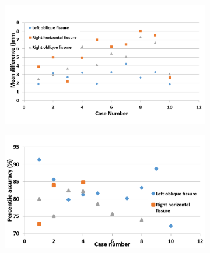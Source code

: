 {\begin{figure}[htbp]
\begin{subfigure}{.6\linewidth}
  \includegraphics[width=\linewidth,trim={{.0\wd0} {.0\wd0} {.0\wd0} {.0\wd0}},clip]{Segmentation/Image/IPFMeanDifference.png}
  \caption{}
  \label{fig:QuantitativeResult-b} 
\end{subfigure}
\begin{subfigure}{.6\linewidth}%
  \includegraphics[width=\linewidth,trim={{.0\wd0} {.0\wd0} {.0\wd0} {.0\wd0}},clip]{Segmentation/Image/NormalPercentileAccurancy.png} %

\end{subfigure}
\end{figure}}
